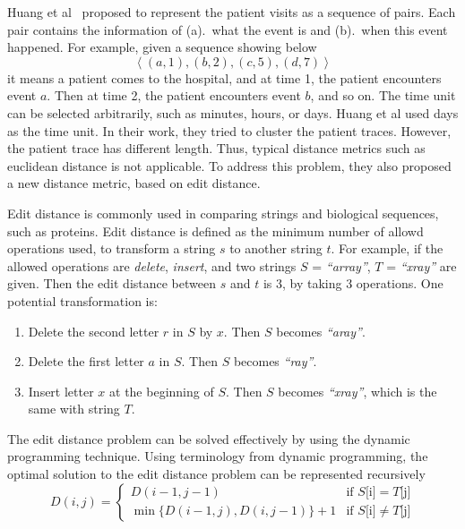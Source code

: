 Huang et al~\cite{huang2012anomaly} proposed to represent the patient visits as a sequence of pairs. Each pair contains the information of (a).~what the event is and (b).~when this event happened. For example, given a sequence showing below
$$
\left\langle(a, 1), (b, 2), (c, 5), (d, 7)\right\rangle 
$$
it means a patient comes to the hospital, and at time 1, the patient encounters event $a$. Then at time 2, the patient encounters event $b$, and so on. The time unit can be selected arbitrarily, such as minutes, hours, or days. Huang et al used days as the time unit. In their work, they tried to cluster the patient traces. However, the patient trace has different length. Thus, typical distance metrics such as euclidean distance is not applicable. To address this problem, they also proposed a new distance metric, based on edit distance.

Edit distance is commonly used in comparing strings and biological sequences, such as proteins. Edit distance is defined as the minimum number of allowd operations used, to transform a string $s$ to another string $t$. For example, if the allowed operations are \textit{delete}, \textit{insert}, and two strings $S$ = \textit{``array''}, $T$ = \textit{``xray''} are given. Then the edit distance between $s$ and $t$ is 3, by taking 3 operations. One potential transformation is: 
\begin{enumerate}
	\item Delete the second letter $r$ in $S$ by $x$. Then $S$ becomes \textit{``aray''}.
	\item Delete the first letter $a$ in $S$. Then $S$ becomes \textit{``ray''}.
	\item Insert letter $x$ at the beginning of $S$. Then $S$ becomes \textit{``xray''}, which is the same with string $T$.
\end{enumerate}

The edit distance problem can be solved effectively by using the dynamic programming technique. Using terminology from dynamic programming, the optimal solution to the edit distance problem can be represented recursively
\begin{equation*}
D(i, j) = \begin{cases} 
   D(i-1, j-1) & \text{if } S\text{[i]} = T\text{[j]} \\
   \min\{D(i-1, j), D(i, j-1)\} + 1       & \text{if } S\text{[i]} \neq T\text{[j]}
  \end{cases}
\end{equation*}

